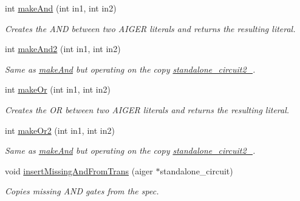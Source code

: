 \begin{DoxyCompactItemize}
int \hyperlink{classParExtractorWorker_ab8384fdb5e6e4ff238097a4fc0a1fb48}{make\-And} (int in1, int in2)
\begin{DoxyCompactList}\small\item\em Creates the A\-N\-D between two A\-I\-G\-E\-R literals and returns the resulting literal. \end{DoxyCompactList}\item 
int \hyperlink{classParExtractorWorker_a4421da7c9d21ab0b944a69e211ebb966}{make\-And2} (int in1, int in2)
\begin{DoxyCompactList}\small\item\em Same as \hyperlink{classParExtractorWorker_ab8384fdb5e6e4ff238097a4fc0a1fb48}{make\-And} but operating on the copy \hyperlink{classParExtractorWorker_a304c66039a45652e273876f7c6da8bcf}{standalone\-\_\-circuit2\-\_\-}. \end{DoxyCompactList}\item 
int \hyperlink{classParExtractorWorker_a1cbe2dcdb25b164cb12a2ce1b61e6761}{make\-Or} (int in1, int in2)
\begin{DoxyCompactList}\small\item\em Creates the O\-R between two A\-I\-G\-E\-R literals and returns the resulting literal. \end{DoxyCompactList}\item 
int \hyperlink{classParExtractorWorker_a5554579e9532cf39953d2db97c9f0525}{make\-Or2} (int in1, int in2)
\begin{DoxyCompactList}\small\item\em Same as \hyperlink{classParExtractorWorker_ab8384fdb5e6e4ff238097a4fc0a1fb48}{make\-And} but operating on the copy \hyperlink{classParExtractorWorker_a304c66039a45652e273876f7c6da8bcf}{standalone\-\_\-circuit2\-\_\-}. \end{DoxyCompactList}\item 
void \hyperlink{classParExtractorWorker_a1482b15ba516ab6ba57f4281ef85b1fb}{insert\-Missing\-And\-From\-Trans} (aiger $\ast$standalone\-\_\-circuit)
\begin{DoxyCompactList}\small\item\em Copies missing A\-N\-D gates from the spec. \end{DoxyCompactList}\end{DoxyCompactItemize}
